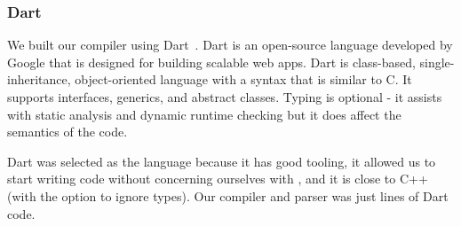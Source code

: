 
\subsubsection{Dart}
We built our compiler using Dart~\cite{dartlang}.
Dart is an open-source language developed by Google that is
designed for building scalable web apps. Dart is class-based,
single-inheritance,
object-oriented language with a syntax that is similar to C. It supports
interfaces, generics, and abstract classes. Typing is optional - it assists
with static analysis and dynamic runtime checking but it does affect the
semantics of the code.

Dart was selected as the language because it has good tooling, it allowed
	us to start writing code without concerning ourselves with ,
	and it is close to C++ (with the option to ignore types).
Our compiler and parser was just  lines of Dart code.
